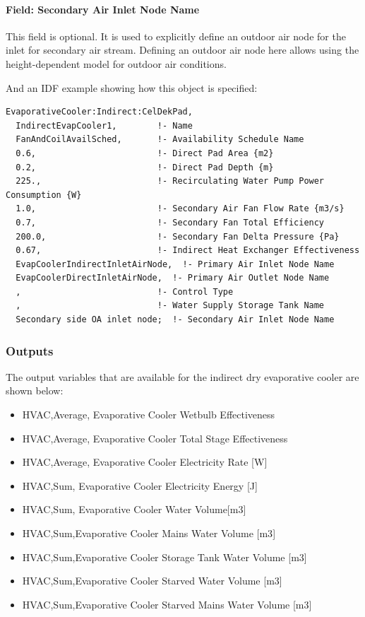 \paragraph{Field: Secondary Air Inlet Node Name}\label{field-secondary-air-inlet-node-name-000}

This field is optional. It is used to explicitly define an outdoor air node for the inlet for secondary air stream. Defining an outdoor air node here allows using the height-dependent model for outdoor air conditions.

And an IDF example showing how this object is specified:

\begin{lstlisting}
EvaporativeCooler:Indirect:CelDekPad,
  IndirectEvapCooler1,        !- Name
  FanAndCoilAvailSched,       !- Availability Schedule Name
  0.6,                        !- Direct Pad Area {m2}
  0.2,                        !- Direct Pad Depth {m}
  225.,                       !- Recirculating Water Pump Power Consumption {W}
  1.0,                        !- Secondary Air Fan Flow Rate {m3/s}
  0.7,                        !- Secondary Fan Total Efficiency
  200.0,                      !- Secondary Fan Delta Pressure {Pa}
  0.67,                       !- Indirect Heat Exchanger Effectiveness
  EvapCoolerIndirectInletAirNode,  !- Primary Air Inlet Node Name
  EvapCoolerDirectInletAirNode,  !- Primary Air Outlet Node Name
  ,                           !- Control Type
  ,                           !- Water Supply Storage Tank Name
  Secondary side OA inlet node;  !- Secondary Air Inlet Node Name
\end{lstlisting}

\subsubsection{Outputs}\label{outputs-2-008}

The output variables that are available for the indirect dry evaporative cooler are shown below:

\begin{itemize}
\item
  HVAC,Average, Evaporative Cooler Wetbulb Effectiveness
\item
  HVAC,Average, Evaporative Cooler Total Stage Effectiveness
\item
  HVAC,Average, Evaporative Cooler Electricity Rate {[}W{]}
\item
  HVAC,Sum, Evaporative Cooler Electricity Energy {[}J{]}
\item
  HVAC,Sum, Evaporative Cooler Water Volume{[}m3{]}
\item
  HVAC,Sum,Evaporative Cooler Mains Water Volume {[}m3{]}
\item
  HVAC,Sum,Evaporative Cooler Storage Tank Water Volume {[}m3{]}
\item
  HVAC,Sum,Evaporative Cooler Starved Water Volume {[}m3{]}
\item
  HVAC,Sum,Evaporative Cooler Starved Mains Water Volume {[}m3{]}
\end{itemize}

